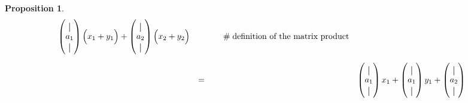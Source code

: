 \documentclass{article}
\theoremstyle{definition}
\newtheorem{proposition}{Proposition}[section]
\newcommand*{\vertbar}{\rule[-1ex]{0.5pt}{2.5ex}}
\begin{document}
\begin{proposition}
\begin{equation*}
\begin{array}{llll}
	\left (
		\hspace{-0.50em}
		\begin{array}{cccc}
			\vertbar \\
			a_{1}    \\
			\vertbar 
		\end{array}	
		\hspace{-0.50em}
	\right )
	\Big (
		\hspace{-0.50em}
		\begin{array}{cccc}
			x_1 + y_1 
		\end{array}
		\hspace{-0.50em}
	\Big ) 
	+
	\left (
		\hspace{-0.50em}
		\begin{array}{cccc}
			\vertbar \\
			a_{2}    \\
			\vertbar 
		\end{array}
		\hspace{-0.50em}
	\right )
	\Big ( 
		\hspace{-0.50em}
		\begin{array}{cccc}
			x_2 + y_2
		\end{array}
		\hspace{-0.50em}
	\Big ) 												&\hspace{3.00em}\mathrel{\#} \text{definition of the matrix product} \\
[25pt]
&=&
	\left (
		\hspace{-0.50em}
		\begin{array}{cccc}
			\vertbar \\
			a_{1}    \\
			\vertbar 
		\end{array}	
		\hspace{-0.50em}
	\right )
	x_1
	+
	\left (
		\hspace{-0.50em}
		\begin{array}{cccc}
			\vertbar \\
			a_{1}    \\
			\vertbar 
		\end{array}	
		\hspace{-0.50em}
	\right )
	y_1
	+
	\left (
		\hspace{-0.50em}
		\begin{array}{cccc}
			\vertbar \\
			a_{2}    \\
			\vertbar 
		\end{array}	
		\hspace{-0.50em}
	\right )

\end{array}
\end{equation*}
\end{proposition}
\end{document}
